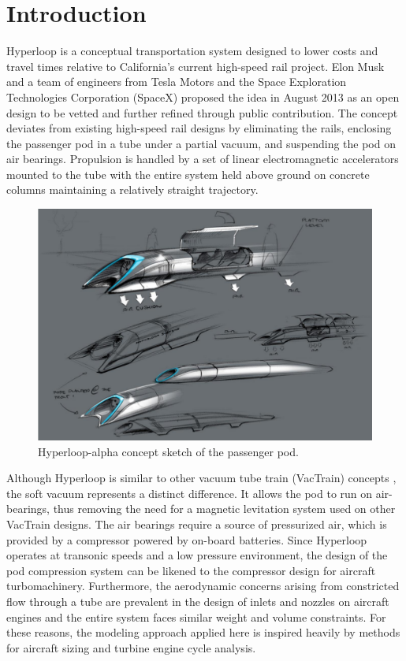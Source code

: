 \documentclass[heading.tex]{subfiles}
\begin{document}
\section{Introduction}

Hyperloop is a conceptual transportation system designed to lower costs and travel times relative to California's current high-speed rail project.
\cite{Musk} Elon Musk and a team of engineers from Tesla Motors and the Space Exploration Technologies Corporation (SpaceX)
proposed the idea in August 2013 as an open design to be vetted and further refined through public contribution.
The concept deviates from existing high-speed rail designs by eliminating the rails, enclosing the passenger pod in a 
tube under a partial vacuum, and suspending the pod on air bearings. Propulsion is handled by a set of linear 
electromagnetic accelerators mounted to the tube with the entire system held above ground on concrete 
columns maintaining a relatively straight trajectory.

\begin{figure}[hbtp]
\centering
\includegraphics[width=.75\textwidth]{images/hyperloopAlphaSketch.png}
 \caption[Hyperloop Concept Sketch]{Hyperloop-alpha concept sketch of the passenger pod. \cite{Musk}}
\label{f:hyperloopSketch}
\end{figure}

Although Hyperloop is similar to other vacuum tube train (VacTrain) concepts \cite{ET3},
the soft vacuum represents a distinct difference.
It allows the pod to run on air-bearings, thus removing the need for a magnetic levitation system used on other VacTrain designs.
The air bearings require a source of pressurized air, which is provided by a compressor powered by on-board batteries. 
Since Hyperloop operates at transonic speeds and a low pressure environment, 
the design of the pod compression system can be likened to the compressor design for aircraft turbomachinery.
Furthermore, the aerodynamic concerns arising from constricted flow through a tube
are prevalent in the design of inlets and nozzles on aircraft engines and the entire system faces similar weight and volume constraints. 
For these reasons, the modeling approach applied here is inspired heavily by methods for aircraft sizing and turbine engine cycle analysis. 
\end{document}
